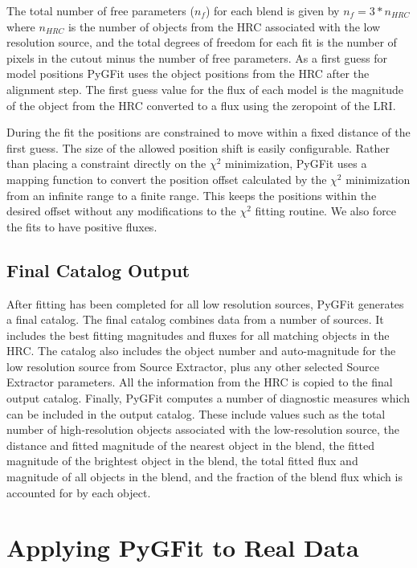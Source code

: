 \documentclass[apj]{emulateapj}
\newcommand{\pygfit}{PyGFit}
\newcommand{\extractor}{Source Extractor}
\begin{document}
The total number of free parameters ($n_f$) for each blend is given by $n_f=3*n_{HRC}$ where $n_{HRC}$ is the number of objects from the HRC associated with the low resolution source, and the total degrees of freedom for each fit is the number of pixels in the cutout minus the number of free parameters.  As a first guess for model positions \pygfit{} uses the object positions from the HRC after the alignment step.  The first guess value for the flux of each model is the magnitude of the object from the HRC converted to a flux using the zeropoint of the LRI.

During the fit the positions are constrained to move within a fixed distance of the first guess.  The size of the allowed position shift is easily configurable.  Rather than placing a constraint directly on the $\chi^2$ minimization, \pygfit{} uses a mapping function to convert the position offset calculated by the $\chi^2$ minimization from an infinite range to a finite range.  This keeps the positions within the desired offset without any modifications to the $\chi^2$  fitting routine.  We also force the fits to have positive fluxes.

\subsection{Final Catalog Output}\label{sec:catalog}

After fitting has been completed for all low resolution sources, \pygfit{} generates a final catalog.  The final catalog combines data from a number of sources.  It includes the best fitting magnitudes and fluxes for all matching objects in the HRC. The catalog also includes the object number and auto-magnitude for the low resolution source from \extractor{}, plus any other selected \extractor{} parameters.  All the information from the HRC is copied to the final output catalog.  Finally, \pygfit{} computes a number of diagnostic measures which can be included in the output catalog.  These include values such as the total number of high-resolution objects associated with the low-resolution source, the distance and fitted magnitude of the nearest object in the blend, the fitted magnitude of the brightest object in the blend, the total fitted flux and magnitude of all objects in the blend, and the fraction of the blend flux which is accounted for by each object.

\section{Applying PyGFit to Real Data}\label{sec:example}
\end{document}
